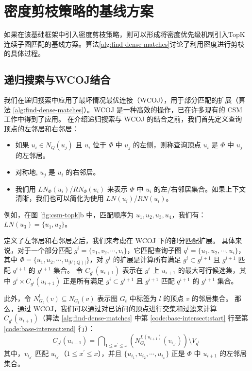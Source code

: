\section{密度剪枝策略的基线方案}
\label{ch3:wegiht-prune-baseline}
如果在该基础框架中引入密度剪枝策略，则可以形成将密度优先级机制引入TopK连续子图匹配的基线方案。算法\ref{alg:find-dense-matches}讨论了利用密度进行剪枝的具体过程。
\subsection{递归搜索与WCOJ结合}

我们在递归搜索中应用了最坏情况最优连接（WCOJ）\cite{wcoj-generic-join-DBLP:journals/sigmod/NgoRR13}，用于部分匹配的扩展（算法 \ref{alg:find-dense-matches}）。WCOJ 是一种高效的操作，已在许多现有的 CSM 工作中得到了应用\cite{csm-graphflow-DBLP:conf/sigmod/KankanamgeSMCS17,csm-graphflowpp-DBLP:journals/tods/MhedhbiKS21,csm-survey:DBLP:journals/pvldb/SunSLH22}。
在介绍递归搜索与 WCOJ 的结合之前，我们首先定义查询顶点的左邻居和右邻居：
\begin{itemize}
    \item 如果 $u_i \in N_Q(u_j)$ 且 $u_i$ 位于 $\Phi$ 中 $u_j$ 的左侧，则称查询顶点 $u_i$ 是 $\Phi$ 中 $u_j$ 的左邻居。
    \item 对称地, $u_j$ 是 $u_i$ 的右邻居。
    \item 我们用 $LN_{\Phi}(u_i)$/$RN_{\Phi}(u_i)$ 来表示 $\Phi$ 中 $u_i$ 的左/右邻居集合。如果上下文清晰，我们也可以简化为使用 $LN(u_i)$/$RN(u_i)$。
\end{itemize}   

例如，在图 \ref{fig:csm-topk}b 中，匹配顺序为 ${u_1, u_2, u_3, u_4}$，我们有：$LN(u_3) = \{u_1, u_2\}$。

定义了左邻居和右邻居之后，我们来考虑在 WCOJ 下的部分匹配扩展。
具体来说，对于一个部分匹配 $g^i = \{v_1, v_2, \cdots, v_i\}$，它匹配查询子图 $q^i = \{u_1, u_2, \cdots, u_i\}$，其中 $\Phi = \{u_1, u_2, \cdots, u_{|V(Q)|}\}$，对 $g^i$ 的扩展是计算所有满足 $g^i \subset g^{i+1}$ 且 $g^{i+1}$ 匹配 $q^{i+1}$ 的 $g^{i+1}$ 集合。
令 $C_{g^{i}}(u_{i+1})$ 表示在 $g^i$ 上 $u_{i+1}$ 的最大可行候选集，其中 $g^i \times C_{g^{i}}(u_{i+1})$ 正是所有满足 $g^i \subset g^{i+1}$ 且 $g^{i+1}$ 匹配 $q^{i+1}$ 的 $g^{i+1}$ 集合。

此外，令 $N_{G_t}^l(v) \subseteq N_{G_t}(v)$ 表示图 $G_t$ 中标签为 $l$ 的顶点 $v$ 的邻居集合。
那么，通过 WCOJ，我们可以通过对已访问的顶点进行交集和过滤来计算 $C_{g^{i}}(u_{i+1})$（算法 \ref{alg:find-dense-matches} 中第 \ref{code:base-intersect:start} 行至第 \ref{code:base-intersect:end} 行）：
\begin{equation} \label{equation:wcoj-intersection}
    C_{g^{i}}(u_{i+1}) = \bigcap\nolimits_{1\leq x^\prime\leq x} \left(  N_{G_t}^{L(u_{i+1})}(v_{i_{x^\prime}}) \right)  \setminus V_{g^i}
\end{equation}
其中，$v_{i_{x^\prime}}$ 匹配 $u_{i_{x^\prime}}$（$1 \leq x^\prime \leq x$），并且 $\{u_{i_1}, u_{i_2}, \cdots, u_{i_x}\}$ 正是 $\Phi$ 中 $u_{i+1}$ 的左邻居集合。

